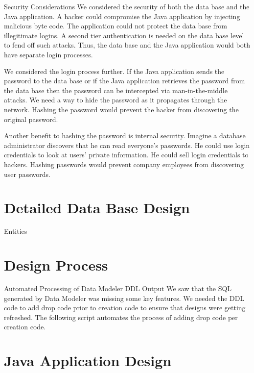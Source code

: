 \documentclass[a4paper,10pt,toc=graduated]{article}
\begin{document}
\begin{mySubsection}{Security Considerations}
We considered the security of both the data base and the Java application.
A hacker could compromise the Java application by injecting malicious byte code.
The application could not protect the data base from illegitimate logins.
A second tier authentication is needed on the data base level to fend off such attacks.
Thus, the data base and the Java application would both have separate login processes.
\newline

We considered the login process further.
If the Java application sends the password to the data base
or if the Java application retrieves the password from the data base
then the password can be intercepted via man-in-the-middle attacks.
We need a way to hide the password as it propagates through the network.
Hashing the password would prevent the hacker from discovering the original password.
\newline

Another benefit to hashing the password is internal security.
Imagine a database administrator discovers that he can read everyone's passwords.
He could use login credentials to look at users' private information.
He could sell login credentials to hackers.
Hashing passwords would prevent company employees from discovering user passwords.

\end{mySubsection}
\section{Detailed Data Base Design}
\begin{mySubsection}{Entities}

\end{mySubsection}
\section{Design Process}
\begin{mySubsection}{Automated Processing of Data Modeler DDL Output}
We saw that the SQL generated by Data Modeler was missing some key features. We needed the DDL code to add drop code prior to creation code to ensure that designs were getting refreshed. The following script automates the process of adding drop code per creation code.
\newline
\end{mySubsection}
\section{Java Application Design}
\end{document}
